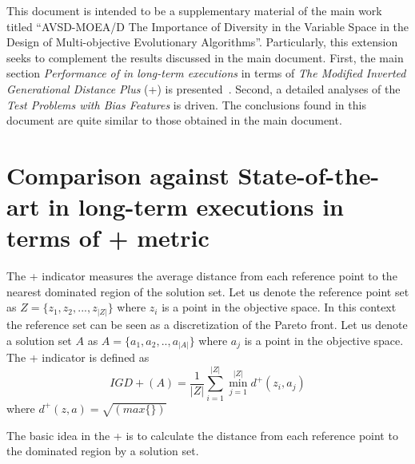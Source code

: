 This document is intended to be a supplementary material of the main work titled ``AVSD-MOEA/D The Importance of Diversity in the Variable Space in the Design of Multi-objective Evolutionary Algorithms''.
%
Particularly, this extension seeks to complement the results discussed in the main document.
%
First, the main section \textit{Performance of \MOEAS{} in long-term executions} in terms of \textit{The Modified Inverted Generational Distance Plus} (\IGD{}+) is presented~\cite{ishibuchi2015modified}.
%
Second, a detailed analyses of the \textit{Test Problems with Bias Features} is driven.
%
The conclusions found in this document are quite similar to those obtained in the main document.






\section{Comparison against State-of-the-art \MOEAS{} in long-term executions in terms of \IGD{}+ metric}

The \IGD{}+ indicator measures the average distance from each reference point to the nearest dominated region of the solution set.
%
Let us denote the reference point set as $Z = \{z_1, z_2, ..., z_{|Z|} \}$ where $z_i$ is a point in the objective space.
%
In this context the reference set can be seen as a discretization of the Pareto front.
%
Let us denote a solution set $A$ as $A = \{a_1, a_2, .., a_{|A|}\}$ where $a_j$ is a point in the objective space.
%
The \IGD{}+ indicator is defined as
\begin{equation}
	IGD+(A) = \frac{1}{|Z|} \sum_{i=1}^{|Z|} \min_{j=1}^{|Z|} d^+(z_i, a_j)
\end{equation}
where $d^+(z, a) = \sqrt{(max\{ \})}$ 

The basic idea in the \IGD{}+ is to calculate the distance from each reference point to the dominated region by a solution set.


